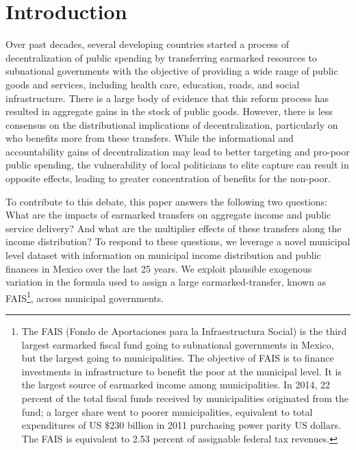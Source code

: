 \documentclass[dv_diss_main.tex]{subfiles}
\begin{document}
\section{Introduction} \label{sec:Introduction}

Over past decades, several developing countries started a process of decentralization of public spending by transferring earmarked resources to subnational governments with the objective of providing a wide range of public goods and services, including health care, education, roads, and social infrastructure. There is a large body of evidence that this reform process has resulted in aggregate gains in the stock of public goods. However, there is less consensus on the distributional implications of  decentralization, particularly on who benefits more from these transfers.  While the informational and accountability gains of decentralization may lead to better targeting and pro-poor public spending, the vulnerability of local politicians to elite capture can result in opposite effects, leading to greater concentration of benefits for the non-poor.

To contribute to this debate, this paper answers the following two questions: What are the impacts of earmarked transfers on aggregate income and public service delivery? And what are the multiplier effects of these transfers along the income distribution? To respond to these questions, we leverage a novel municipal level dataset with information on municipal income distribution and public finances in Mexico over the last 25 years. We exploit plausible exogenous variation in the formula used to assign a large  earmarked-transfer, known as FAIS\footnote{The FAIS (Fondo de Aportaciones para la Infraestructura Social) is the third largest earmarked fiscal fund going to subnational governments in Mexico, but the largest going to municipalities. The objective of FAIS is to finance investments in infrastructure to benefit the poor at the municipal level. It is the largest source of earmarked income among municipalities. In 2014, 22 percent of the total fiscal funds received by municipalities originated from the fund; a larger share went to poorer municipalities, equivalent to total expenditures of US $\$230$ billion in 2011 purchasing power parity US dollars. The FAIS is equivalent to 2.53 percent of assignable federal tax revenues.}, across municipal governments.
\end{document}
